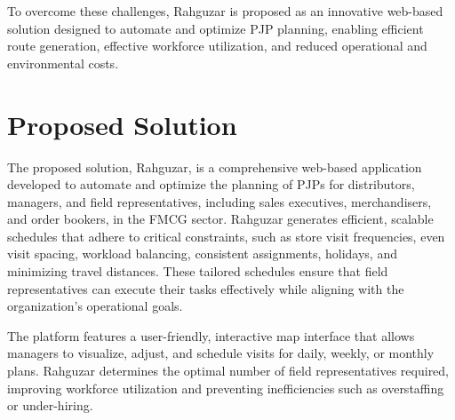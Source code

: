 
To overcome these challenges, Rahguzar is proposed as an innovative web-based solution designed to automate and optimize PJP planning, enabling efficient route generation, effective workforce utilization, and reduced operational and environmental costs.
\section{Proposed Solution}


The proposed solution, Rahguzar, is a comprehensive web-based application developed to automate and optimize the planning of PJPs for distributors, managers, and field representatives, including sales executives, merchandisers, and order bookers, in the FMCG sector. Rahguzar generates efficient, scalable schedules that adhere to critical constraints, such as store visit frequencies, even visit spacing, workload balancing, consistent assignments, holidays, and minimizing travel distances. These tailored schedules ensure that field representatives can execute their tasks effectively while aligning with the organization’s operational goals.

The platform features a user-friendly, interactive map interface that allows managers to visualize, adjust, and schedule visits for daily, weekly, or monthly plans. Rahguzar determines the optimal number of field representatives required, improving workforce utilization and preventing inefficiencies such as overstaffing or under-hiring.


